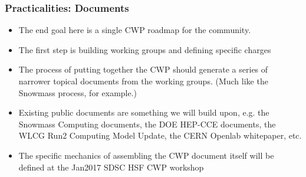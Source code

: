 \begin{frame}
\frametitle{Practicalities: Documents}

\begin{itemize}
\item The end goal here is a single CWP roadmap for the community. 
\item The first step is building working groups and defining specific charges
\item The process of putting together the CWP should generate a series of narrower topical documents from the working groups. (Much like the Snowmass process, for example.)
\item Existing public documents are something we will build upon, e.g. the Snowmass Computing documents, the DOE HEP-CCE documents, the WLCG Run2 Computing Model Update, the CERN Openlab whitepaper, etc.
\item The specific mechanics of assembling the CWP document itself will be defined at the Jan2017 SDSC HSF CWP workshop
\end{itemize}

\end{frame}


